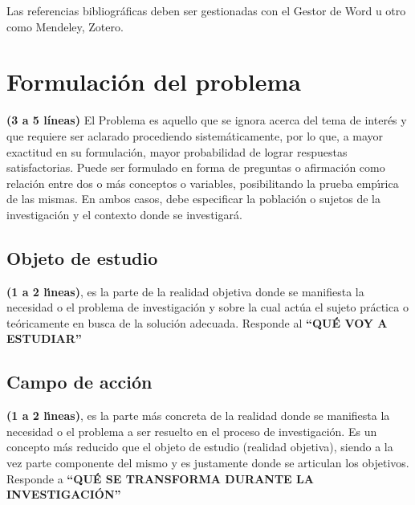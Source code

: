 Las referencias bibliogr\'{a}ficas deben ser gestionadas con el Gestor de Word u otro como Mendeley, 
Zotero. 



\section{Formulaci\'on del problema}
\label{cap0:sec:formulacion_del_problema}

\textbf{(3 a 5 l\'ineas)} El Problema es aquello que se ignora acerca del tema de inter\'{e}s y que 
requiere ser aclarado procediendo sistem\'{a}ticamente, por lo que, a mayor exactitud en su 
formulaci\'{o}n, mayor probabilidad de lograr respuestas satisfactorias. Puede ser formulado en 
forma de preguntas o afirmaci\'{o}n como relaci\'{o}n entre dos o m\'{a}s conceptos o variables, 
posibilitando la prueba emp\'{\i}rica de las mismas. En ambos casos, debe especificar la 
poblaci\'{o}n o sujetos de la investigaci\'{o}n y el contexto donde se investigar\'{a}.


\subsection{Objeto de estudio}
\label{cap0:sec:objecto_de_estudio}

\textbf{(1 a 2 l\'{\i}neas)}, es la parte de la realidad objetiva donde se manifiesta la necesidad 
o el problema de investigaci\'{o}n y sobre la cual act\'{u}a el sujeto pr\'{a}ctica o 
te\'{o}ricamente en busca de la soluci\'{o}n adecuada. Responde al \textbf{``QU\'{E} VOY A ESTUDIAR''}


\subsection{Campo de acci\'on}
\label{cap0:sec:campo_de_accion}

\textbf{(1 a 2 l\'{\i}neas)}, es la parte m\'{a}s concreta de la realidad donde se manifiesta la 
necesidad o el problema a ser resuelto en el proceso de investigaci\'{o}n. Es un concepto m\'{a}s 
reducido que el objeto de estudio (realidad objetiva), siendo a la vez parte componente del mismo 
y es justamente donde se articulan los objetivos. Responde a 
\textbf{``QU\'{E} SE TRANSFORMA DURANTE LA INVESTIGACI\'{O}N''}



